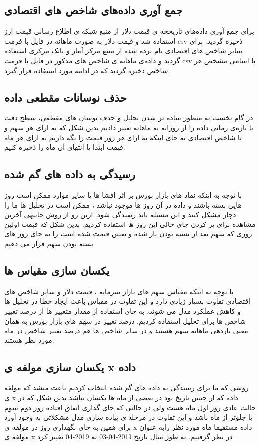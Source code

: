 \documentclass[12pt]{report}
\begin{document}
\subsection{جمع آوری داده‌های شاخص های اقتصادی}
برای جمع آوری داده‌های تاریخچه ی قیمت دلار از
منبع شبکه ی اطلاع رسانی قیمت ارز
استفاده شد و قیمت دلار به صورت ماهانه در فایل با فرمت csv ذخیره گردید.
برای سایر شاخص های اقتصادی نام برده شده از منبع مرکز آمار و بانک مرکزی استفاده گردید و داده‌ی ماهانه ی شاخص های مذکور در فایل با فرمت csv با اسامی مشخص هر شاخص ذخیره گردید که در ادامه مورد استفاده قرار گیرد.

\subsection{ حذف نوسانات مقطعی داده}
در گام نخست به منظور ساده تر شدن تحلیل و حذف نوسان های مقطعی، سطح دقت یا بازه‌ی زمانی داده را از روزانه به ماهانه تغییر دادیم بدین شکل که به ازای هر سهم و یا شاخص اقتصادی به جای اینکه به ازای هر روز قیمت را نگه داریم به ازای هر ماه قیمت ابتدا یا انتهای آن ماه را ذخیره کنیم.


\subsection{رسیدگی به داده های گم شده}

با توجه به اینکه نماد های بازار بورس  بر اثر افشا ها یا سایر موارد ممکن است روز هایی بسته باشند و داده در آن روز ها موجود نباشد ، ممکن است در تحلیل ها ما را دچار مشکل کنند و این مسئله باید رسیدگی شود. ازین رو از روش
جاینهی آخرین مشاهده
برای پر کردن جای خالی این روز ها استفاده کردیم. بدین شکل که قیمت اولین روزی که سهم بعد از بسته بودن باز شده و تعیین قیمت شده است را به جای روز های بسته بودن سهم قرار می دهیم

\subsection{یکسان سازی مقیاس ها}
با توجه به اینکه مقیاس سهم های بازار سرمایه ، قیمت دلار و سایر شاخص های اقتصادی تفاوت بسیار زیادی دارد و این تفاوت در مقیاس باعث ایجاد خطا در تحلیل ها و کاهش عملکرد مدل می شوند، به جای استفاده از مقدار متغییر ها از درصد تغییر شاخص ها برای تحلیل استفاده کردیم. درصد تغییر در سهم های بازار بورس به همان معنی بازدهی ماهانه سهم هستند و در سایر شاخص ها هم درصد تغییر شاخص در ماه مورد نظر هستند.
\subsection{یکسان سازی مولفه ی x داده}
روشی که ما برای رسیدگی به داده های گم شده انتخاب کردیم باعث میشد که مولفه ی x داده که از جنس تاریخ بود در بعضی از ماه ها یکسان نباشد بدین شکل که در حالت عادی روز اول ماه هست ولی در حالتی که جای گذاری اتفاق افتاده روز دوم سوم یا جلوتر از ماه باشد و این تفاوت در مرحله ی پیاده سازی مدل مشکلاتی به وجود آورد برای همین به جای نگهداری روز در مولفه ی x داده مستقیما ماه مورد نظر رابه عنوان مولفه ی  x در نظر گرفتیم. به طور مثال تاریخ 2019-04-03 به 2019-04 تغییر کرد
\end{document}
